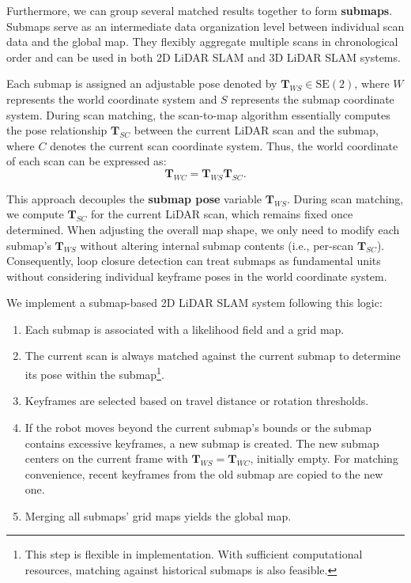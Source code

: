 Furthermore, we can group several matched results together to form \textbf{submaps}. Submaps serve as an intermediate data organization level between individual scan data and the global map. They flexibly aggregate multiple scans in chronological order and can be used in both 2D LiDAR SLAM and 3D LiDAR SLAM systems.  

Each submap is assigned an adjustable pose denoted by $\bm{T}_{WS} \in \mathrm{SE}(2)$, where $W$ represents the world coordinate system and $S$ represents the submap coordinate system. During scan matching, the scan-to-map algorithm essentially computes the pose relationship $\bm{T}_{SC}$ between the current LiDAR scan and the submap, where $C$ denotes the current scan coordinate system. Thus, the world coordinate of each scan can be expressed as:  
\begin{equation}\label{key}  
\bm{T}_{WC} = \bm{T}_{WS} \bm{T}_{SC}.  
\end{equation}  

This approach decouples the \textbf{submap pose} variable $\bm{T}_{WS}$. During scan matching, we compute $\bm{T}_{SC}$ for the current LiDAR scan, which remains fixed once determined. When adjusting the overall map shape, we only need to modify each submap's $\bm{T}_{WS}$ without altering internal submap contents (i.e., per-scan $\bm{T}_{SC}$). Consequently, loop closure detection can treat submaps as fundamental units without considering individual keyframe poses in the world coordinate system.  

We implement a submap-based 2D LiDAR SLAM system following this logic:  
\begin{enumerate}  
	\item Each submap is associated with a likelihood field and a grid map.  
	\item The current scan is always matched against the current submap to determine its pose within the submap\footnote{This step is flexible in implementation. With sufficient computational resources, matching against historical submaps is also feasible.}.  
	\item Keyframes are selected based on travel distance or rotation thresholds.  
	\item If the robot moves beyond the current submap's bounds or the submap contains excessive keyframes, a new submap is created. The new submap centers on the current frame with $\bm{T}_{WS} = \bm{T}_{WC}$, initially empty. For matching convenience, recent keyframes from the old submap are copied to the new one.  
	\item Merging all submaps' grid maps yields the global map.  
\end{enumerate}  

